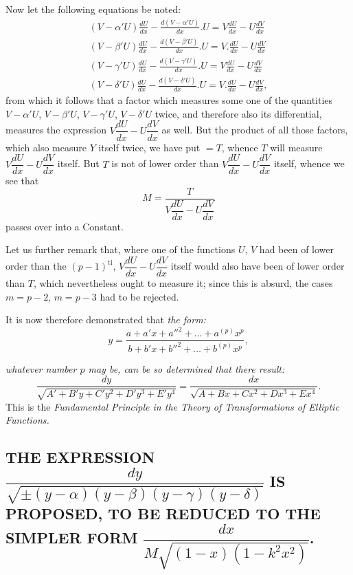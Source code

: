 \documentclass{article}
\begin{document}
Now let the following equations be noted:
\[
\begin{gathered}
(V-\alpha'U)\frac{dU}{dx}-\frac{d(V-\alpha'U)}{dx}.U=V\frac{dU}{dx}-U\frac{dV}{dx}\\
(V-\beta'U)\frac{dU}{dx}-\frac{d(V-\beta'U)}{dx}.U=V.\frac{dU}{dx}-U\frac{dV}{dx}\\
(V-\gamma'U)\frac{dU}{dx}-\frac{d(V-\gamma'U)}{dx}.U=V\frac{dU}{dx}-U\frac{dV}{dx}\\
(V-\delta'U)\frac{dU}{dx}-\frac{d(V-\delta'U)}{dx}.U=V.\frac{dU}{dx}-U\frac{dV}{dx},
\end{gathered}
\]
from which it follows that a factor which measures some one of the quantities $V-\alpha'U$, $V-\beta'U$, $V-\gamma'U$, $V-\delta'U$ twice, and therefore also its differential, measures the expression $V\dfrac{dU}{dx}-U\dfrac{dV}{dx}$ as well. But the product of all those factors, which also measure $Y$ itself twice, we have put $=T$, whence $T$ will measure $V\dfrac{dU}{dx}-U\dfrac{dV}{dx}$ itself. But $T$ is not of lower order than $V\dfrac{dU}{dx}-U\dfrac{dV}{dx}$ itself, whence we see that
\[
M=\frac{T}{V\dfrac{dU}{dx}-U\dfrac{dV}{dx}}
\]
passes over into a Constant.

Let us further remark that, where one of the functions $U$, $V$ had been of lower order than the $(p-1)^{\mathrm{ti}}$, $V\dfrac{dU}{dx}-U\dfrac{dV}{dx}$ itself would also have been of lower order than $T$, which nevertheless ought to measure it; since this is absurd, the cases $m=p-2$, $m=p-3$ had to be rejected.

It is now therefore demonstrated that \emph{the form:}
\[
y=\frac{a+a'x+a''^{2}+\ldots+a^{(p)}x^{p}}{b+b'x+b''^{2}+\ldots+b^{(p)}x^{p}},
\]

\emph{whatever number $p$ may be, can be so determined that there result:}
\[
\frac{dy}{\sqrt{A'+B'y+C'y^{2}+D'y^{3}+E'y^{4}}}=\frac{dx}{\sqrt{A+Bx+Cx^{2}+Dx^{3}+Ex^{4}}}.
\]
This is the \emph{Fundamental Principle in the Theory of Transformations of Elliptic Functions.}

\subsection*{THE EXPRESSION $\dfrac{dy}{\sqrt{\pm(y-\alpha)(y-\beta)(y-\gamma)(y-\delta)}}$ IS PROPOSED, TO BE REDUCED TO THE SIMPLER FORM $\dfrac{dx}{M\sqrt{(1-x)(1-k^{2}x^{2})}}$.}
\end{document}
